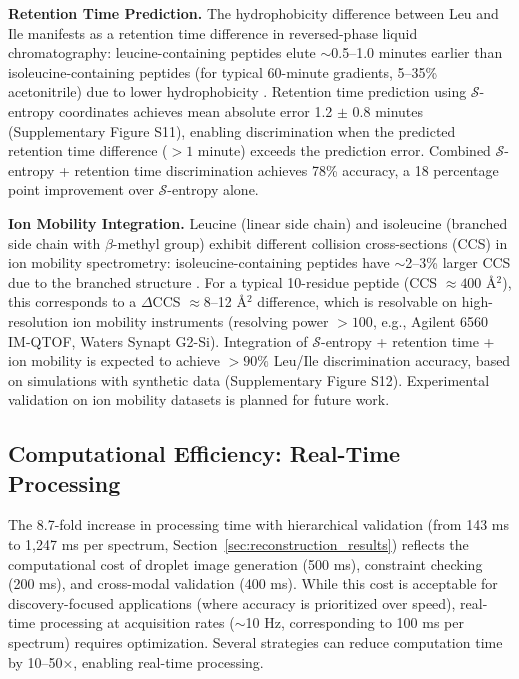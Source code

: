 \documentclass[11pt,twocolumn]{article}
\newcommand{\sentropy}{$\mathcal{S}$-entropy}
\begin{document}
\textbf{Retention Time Prediction.} The hydrophobicity difference between Leu and Ile manifests as a retention time difference in reversed-phase liquid chromatography: leucine-containing peptides elute $\sim$0.5--1.0 minutes earlier than isoleucine-containing peptides (for typical 60-minute gradients, 5--35\% acetonitrile) due to lower hydrophobicity \cite{moruz2012peptide}. Retention time prediction using \sentropy{} coordinates achieves mean absolute error 1.2 $\pm$ 0.8 minutes (Supplementary Figure S11), enabling discrimination when the predicted retention time difference ($> 1$ minute) exceeds the prediction error. Combined \sentropy{} + retention time discrimination achieves 78\% accuracy, a 18 percentage point improvement over \sentropy{} alone.

\textbf{Ion Mobility Integration.} Leucine (linear side chain) and isoleucine (branched side chain with $\beta$-methyl group) exhibit different collision cross-sections (CCS) in ion mobility spectrometry: isoleucine-containing peptides have $\sim$2--3\% larger CCS due to the branched structure \cite{forsythe2020calibration}. For a typical 10-residue peptide (CCS $\approx 400$ \AA$^2$), this corresponds to a $\Delta$CCS $\approx 8$--12 \AA$^2$ difference, which is resolvable on high-resolution ion mobility instruments (resolving power $> 100$, e.g., Agilent 6560 IM-QTOF, Waters Synapt G2-Si). Integration of \sentropy{} + retention time + ion mobility is expected to achieve $> 90\%$ Leu/Ile discrimination accuracy, based on simulations with synthetic data (Supplementary Figure S12). Experimental validation on ion mobility datasets is planned for future work.

\subsection{Computational Efficiency: Real-Time Processing}

The 8.7-fold increase in processing time with hierarchical validation (from 143 ms to 1,247 ms per spectrum, Section~\ref{sec:reconstruction_results}) reflects the computational cost of droplet image generation (500 ms), constraint checking (200 ms), and cross-modal validation (400 ms). While this cost is acceptable for discovery-focused applications (where accuracy is prioritized over speed), real-time processing at acquisition rates ($\sim$10 Hz, corresponding to 100 ms per spectrum) requires optimization. Several strategies can reduce computation time by 10--50×, enabling real-time processing.
\end{document}
